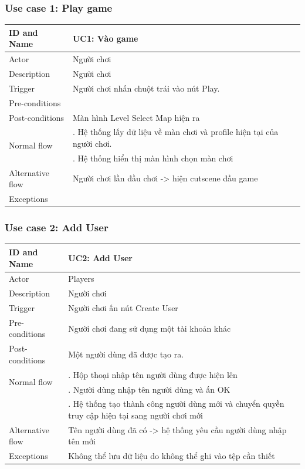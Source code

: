 \subsubsection{Use case 1: Play game}
\begin{center}
	\begin{tabular}{|l|p{12cm}|}
		\hline
		ID and Name & UC1: Vào game \\
		\hline
		Actor  & Người chơi \\
		\hline
		Description  & Người chơi\\
		\hline
		Trigger  & Người chơi nhấn chuột trái vào nút Play.\\
		\hline
		Pre-conditions & \\
		\hline
		Post-conditions  & Màn hình Level Select Map hiện ra\\
		\hline
		\multirow{2}{*}{Normal flow}      &\qquad 1. Hệ thống lấy dữ liệu về màn chơi và profile hiện tại của người chơi.\\
		&\qquad 2. Hệ thống hiển thị màn hình chọn màn chơi\\
		\hline
		Alternative flow  & Người chơi lần đầu chơi -> hiện cutscene đầu game\\
		\hline
		Exceptions  &\\
		\hline
	\end{tabular}
\end{center}
\subsubsection{Use case 2: Add User}
\begin{center}
	\begin{tabular}{|l|p{12cm}|}
		\hline
		ID and Name & UC2: Add User \\
		\hline
		Actor  & Players \\
		\hline
		Description  & Người chơi \\
		\hline
		Trigger  & Người chơi ấn nút Create User\\
		\hline
		Pre-conditions & Người chơi đang sử dụng một tài khoản khác \\
		\hline
		Post-conditions  & Một người dùng đã được tạo ra.\\
		\hline
		\multirow{2}{*}{Normal flow}      &\qquad 1. Hộp thoại nhập tên người dùng được hiện lên\\
		&\qquad 2. Người dùng nhập tên người dùng và ấn OK\\
		&\qquad 3. Hệ thống tạo thành công người dùng mới và chuyển quyền truy cập hiện tại sang người chơi mới\\
		\hline
		Alternative flow  & Tên người dùng đã có -> hệ thống yêu cầu người dùng nhập tên mới\\
		\hline
		Exceptions  & Không thể lưu dữ liệu do không thể ghi vào tệp cần thiết\\
		\hline
	\end{tabular}
\end{center}
